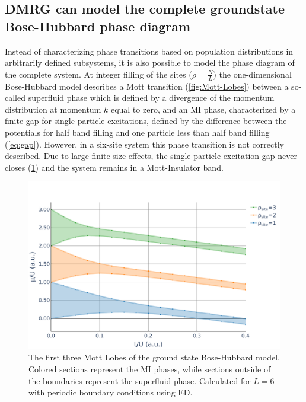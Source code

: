 \documentclass[twoside,twocolumn,9pt]{article}
\begin{document}
\subsection{DMRG can model the complete groundstate Bose-Hubbard phase diagram}

Instead of characterizing phase transitions based on population distributions in arbitrarily defined subsystems, it is also possible to model the phase diagram of the complete system. At integer filling of the sites ($\rho=\frac{N}{L}$) the one-dimensional Bose-Hubbard model describes a Mott transition (\cref{fig:Mott-Lobes}) between a so-called superfluid phase which is defined by a divergence of the momentum distribution at momentum $k$ equal to zero, and an MI phase, characterized by a finite gap for single particle excitations, defined by the difference between the potentials for half band filling and one particle less than half band filling (\cref{eq:gap}). However, in a six-site system this phase transition is not correctly described. Due to large finite-size effects, the single-particle excitation gap never closes (\cref{fig:Mott-Lobes-ED}) and the system remains in a Mott-Insulator band.
\begin{center}
  \begin{figure}
      \includegraphics[width=\linewidth]{../code/figures/Mott-Lobes-ED.pdf}
      \caption{The first three Mott Lobes of the ground state Bose-Hubbard model. Colored sections represent the MI phases, while sections outside of the boundaries represent the superfluid phase. Calculated for $L=6$ with periodic boundary conditions using ED.}
      \label{fig:Mott-Lobes-ED}
  \end{figure}
\end{center}
\end{document}
